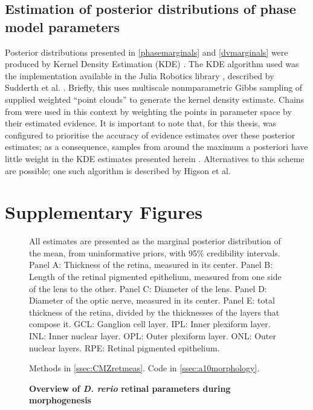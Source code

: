 \subsection{Estimation of posterior distributions of phase model parameters}
\label{ssec:GMCkde}
Posterior distributions presented in \autoref{phasemarginals} and \autoref{dvmarginals} were produced by Kernel Density Estimation (KDE) \cite[p. 122]{Bishop2006}. The KDE algorithm used was the implementation available in the Julia Robotics library , described by Sudderth et al. \cite{Sudderth2010}. Briefly, this uses multiscale nonmparametric Gibbs sampling of supplied weighted ``point clouds'' to generate the kernel density estimate. Chains from  were used in this context by weighting the points in parameter space by their estimated evidence. It is important to note that, for this thesis,  was configured to prioritise the accuracy of evidence estimates over these posterior estimates; as a consequence, samples from around the maximum a posteriori have little weight in the KDE estimates presented herein \cite{Higson2018}. Alternatives to this scheme are possible; one such algorithm is described by Higson et al. \cite{Higson2019}

\section{Supplementary Figures}

\begin{figure}[!h]
    \caption{{\bf Overview of \textit{D. rerio} retinal parameters during morphogenesis}}
    All estimates are presented as the marginal posterior distribution of the mean, from uninformative priors, with 95\% credibility intervals.
    Panel A: Thickness of the retina, measured in its center.
    Panel B: Length of the retinal pigmented epithelium, measured from one side of the lens to the other.
    Panel C: Diameter of the lens.
    Panel D: Diameter of the optic nerve, measured in its center.
    Panel E: total thickness of the retina, divided by the thicknesses of the layers that compose it. GCL: Ganglion cell layer. IPL: Inner plexiform layer. INL: Inner nuclear layer. OPL: Outer plexiform layer. ONL: Outer nuclear layers. RPE: Retinal pigmented epithelium.

    Methods in \autoref{ssec:CMZretmeas}. Code in \autoref{ssec:a10morphology}.
    \label{morphology}
\end{figure}

